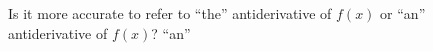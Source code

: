 {Is it more accurate to refer to ``the'' antiderivative of $f(x)$ or ``an'' antiderivative of $f(x)$?
}
{``an''
}

